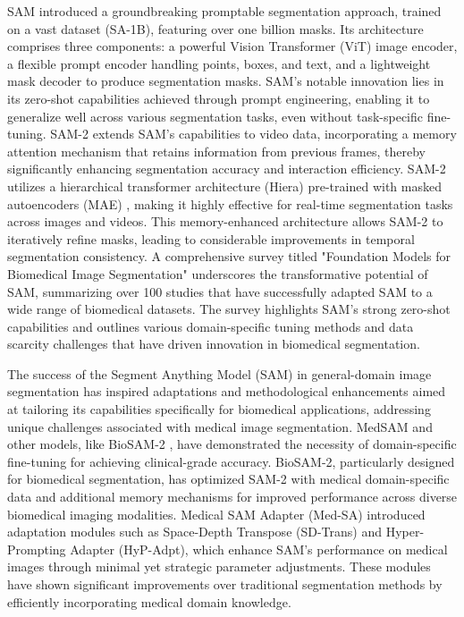 \documentclass[./dissertation.tex]{subfiles}
\begin{document}

SAM \cite{kirillov2023segment} introduced a groundbreaking promptable segmentation approach, trained on a vast dataset (SA-1B), featuring over one billion masks. Its architecture comprises three components: a powerful Vision Transformer (ViT) image encoder, a flexible prompt encoder handling points, boxes, and text, and a lightweight mask decoder to produce segmentation masks. SAM's notable innovation lies in its zero-shot capabilities achieved through prompt engineering, enabling it to generalize well across various segmentation tasks, even without task-specific fine-tuning. SAM-2 \cite{ravi2024sam} extends SAM's capabilities to video data, incorporating a memory attention mechanism that retains information from previous frames, thereby significantly enhancing segmentation accuracy and interaction efficiency. SAM-2 utilizes a hierarchical transformer architecture (Hiera) \cite{ryali2023hiera,bolya2023window} pre-trained with masked autoencoders (MAE) \cite{he2022masked}, making it highly effective for real-time segmentation tasks across images and videos. This memory-enhanced architecture allows SAM-2 to iteratively refine masks, leading to considerable improvements in temporal segmentation consistency. A comprehensive survey titled "Foundation Models for Biomedical Image Segmentation" \cite{lee2024foundation} underscores the transformative potential of SAM, summarizing over 100 studies that have successfully adapted SAM to a wide range of biomedical datasets. The survey highlights SAM's strong zero-shot capabilities and outlines various domain-specific tuning methods and data scarcity challenges that have driven innovation in biomedical segmentation.



The success of the Segment Anything Model (SAM) in general-domain image segmentation has inspired adaptations and methodological enhancements aimed at tailoring its capabilities specifically for biomedical applications, addressing unique challenges associated with medical image segmentation. MedSAM \cite{ma2024segment} and other models, like BioSAM-2 \cite{yan2024biomedical}, have demonstrated the necessity of domain-specific fine-tuning for achieving clinical-grade accuracy. BioSAM-2, particularly designed for biomedical segmentation, has optimized SAM-2 with medical domain-specific data and additional memory mechanisms for improved performance across diverse biomedical imaging modalities. Medical SAM Adapter (Med-SA) \cite{wu2023medical} introduced adaptation modules such as Space-Depth Transpose (SD-Trans) and Hyper-Prompting Adapter (HyP-Adpt), which enhance SAM's performance on medical images through minimal yet strategic parameter adjustments. These modules have shown significant improvements over traditional segmentation methods by efficiently incorporating medical domain knowledge.
\end{document}
